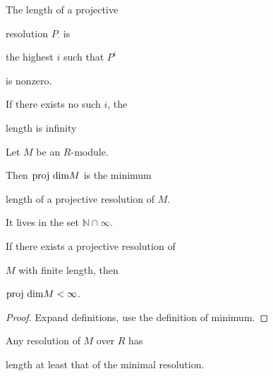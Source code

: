 \begin{definition}

  \label{def:length_of_resl}


  The length of a projective

  resolution $P_\cdot$ is 

  the highest $i$ such that $P^i$

  is nonzero.

  If there exists no such $i$, the

  length is infinity

\end{definition}



\begin{definition}

  \label{def:projdim}


  Let $M$ be an $R$-module. 

  Then $\text{proj dim} M$ is the minimum 

  length of a projective resolution of $M$.

  It lives in the set $\mathbb{N} \cap \infty$.

\end{definition}



\begin{lemma}

  \label{lem:finite_resl_implies_finite_projdim}


  If there exists a projective resolution of

  $M$ with finite length, then 

  $\text{proj dim} M < \infty$.

\end{lemma}



\begin{proof}

  Expand definitions, use the definition of minimum.

\end{proof}



\begin{lemma}

  \label{lem:min_resl_has_min_length}

  Any resolution of $M$ over $R$ has 

  length at least that of the minimal resolution.

\end{lemma}




